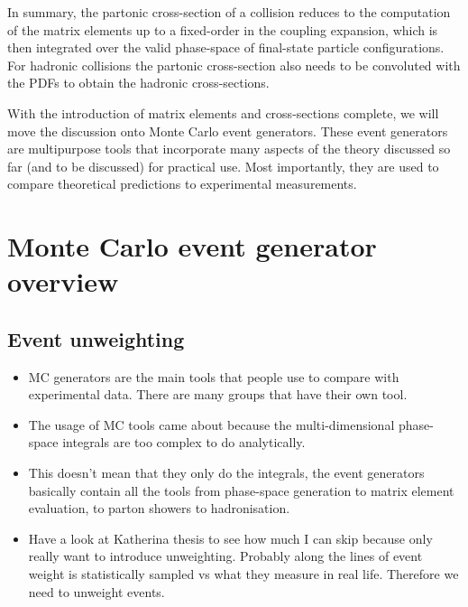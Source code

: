\documentclass[main.tex]{subfiles}
\begin{document}
    In summary, the partonic cross-section of a collision
    reduces to the computation of the matrix elements
    up to a fixed-order in the coupling expansion,
    which is then integrated over the valid phase-space of
    final-state particle configurations. For hadronic
    collisions the partonic cross-section also needs to
    be convoluted with the PDFs to obtain the hadronic
    cross-sections.

    With the introduction of matrix elements and
    cross-sections complete, we will move the discussion onto
    Monte Carlo event generators. These event
    generators are multipurpose tools that
    incorporate many aspects of the theory discussed
    so far (and to be discussed) for practical use.
    Most importantly, they are
    used to compare theoretical predictions to
    experimental measurements.

\section{Monte Carlo event generator overview}
\subsection{Event unweighting}
\begin{itemize}
    \item MC generators are the main tools that
    people use to compare with experimental data.
    There are many groups that have their own tool.
    \item The usage of MC tools came about because
    the multi-dimensional phase-space integrals
    are too complex to do analytically.
    \item This doesn't mean that they only do
    the integrals, the event generators basically
    contain all the tools from phase-space generation
    to matrix element evaluation, to parton showers
    to hadronisation.
    \item Have a look at Katherina thesis to see
    how much I can skip because only really want to
    introduce unweighting. Probably along the lines
    of event weight is statistically sampled vs
    what they measure in real life. Therefore we need
    to unweight events.
\end{itemize}
\end{document}
